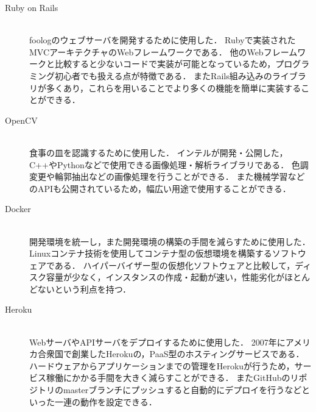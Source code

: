 \documentclass[../report]{subfiles}
\begin{document}
\begin{description}
    \item[Ruby on Rails] \mbox{} \\
        foologのウェブサーバを開発するために使用した．
        Rubyで実装されたMVCアーキテクチャのWebフレームワークである．
        他のWebフレームワークと比較すると少ないコードで実装が可能となっているため，プログラミング初心者でも扱える点が特徴である．
        またRails組み込みのライブラリが多くあり，これらを用いることでより多くの機能を簡単に実装することができる．

    \item[OpenCV] \mbox{} \\
        食事の皿を認識するために使用した．
        インテルが開発・公開した，C++やPythonなどで使用できる画像処理・解析ライブラリである．
        色調変更や輪郭抽出などの画像処理を行うことができる．
        また機械学習などのAPIも公開されているため，幅広い用途で使用することができる．

    \item[Docker] \mbox{} \\
        開発環境を統一し，また開発環境の構築の手間を減らすために使用した．
        Linuxコンテナ技術を使用してコンテナ型の仮想環境を構築するソフトウェアである．
        ハイパーバイザー型の仮想化ソフトウェアと比較して，ディスク容量が少なく，インスタンスの作成・起動が速い，性能劣化がほとんどないという利点を持つ．

  \item[Heroku] \mbox{} \\
    WebサーバやAPIサーバをデプロイするために使用した．
    2007年にアメリカ合衆国で創業したHerokuの，PaaS型のホスティングサービスである．
    ハードウェアからアプリケーションまでの管理をHerokuが行うため，サービス稼働にかかる手間を大きく減らすことができる．
    またGitHubのリポジトリのmasterブランチにプッシュすると自動的にデプロイを行うなどといった一連の動作を設定できる．
\end{description}
\end{document}
